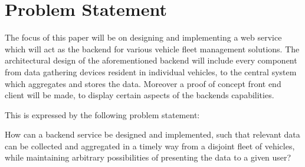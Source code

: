 \section{Problem Statement}

The focus of this paper will be on designing and implementing a web service which will act as the backend for various vehicle fleet management solutions.
The architectural design of the aforementioned backend will include every component from data gathering devices resident in individual vehicles, to the central system which aggregates and stores the data.
Moreover a proof of concept front end client will be made, to display certain aspects of the backends capabilities.

This is expressed by the following problem statement:

\medskip
{\addtolength{\leftskip}{10mm}\addtolength{\rightskip}{10mm}\noindent\hrulefill\it

\noindent How can a backend service be designed and implemented, such that relevant data can be collected and aggregated in a timely way from a disjoint fleet of vehicles, while maintaining arbitrary possibilities of presenting the data to a given user?

\noindent\hrulefill

}

